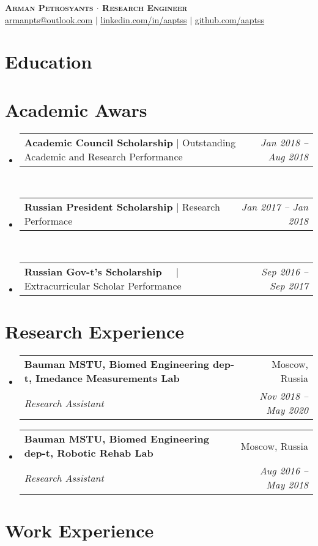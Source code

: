 \documentclass[a4paper,11pt]{article}
\makeatletter
\newcommand{\resumeSubheading}[4]{
  \vspace{-2pt}\item
    \begin{tabular*}{0.97\textwidth}[t]{l@{\extracolsep{\fill}}r}
      \textbf{#1} & #2 \\
      \textit{\small#3} & \textit{\small #4} \\
    \end{tabular*}\vspace{-7pt}
}
\newcommand{\resumeProjectHeading}[2]{
    \item
    \begin{tabular*}{0.97\textwidth}{l@{\extracolsep{\fill}}r}
      \small#1 & #2 \\
    \end{tabular*}\vspace{-7pt}
}
\newcommand{\resumeSubHeadingListStart}{\begin{itemize}[leftmargin=0.15in, label={}]}
\newcommand{\resumeSubHeadingListEnd}{\end{itemize}}
\newcommand{\DesPosition}{\(\cdot\) Research Engineer}
\makeatother
\begin{document}
\begin{center}
    \textbf{\Huge \scshape Arman Petrosyants \DesPosition } \\ \vspace{1pt}
    \href{mailto:armanpts@outlook.com}{\underline{armanpts@outlook.com}} $|$ 
    \href{https://linkedin.com/in/aaptss}{\underline{linkedin.com/in/aaptss}} $|$
    \href{https://github.com/aaptss}{\underline{github.com/aaptss}}
\end{center}

\section{Education}
  \resumeSubHeadingListStart
	
	
	
  \resumeSubHeadingListEnd

\section{Academic Awars}
    \resumeSubHeadingListStart      
      \resumeProjectHeading
          {\textbf{Academic Council Scholarship} $|$ {Outstanding Academic and Research Performance}}{\emph{Jan 2018 -- Aug 2018}}\\
      \resumeProjectHeading
          {\textbf{Russian President Scholarship} $|$ {Research Performace}}{\emph{Jan 2017 -- Jan 2018}}\\
      \resumeProjectHeading
          {\textbf{Russian Gov-t's Scholarship} $\> \> \> \> \> |$ {Extracurricular Scholar Performance}}{\emph{Sep 2016 -- Sep 2017}}
    \resumeSubHeadingListEnd

\section{Research Experience}
  \resumeSubHeadingListStart
	
    \resumeSubheading
      {Bauman MSTU, Biomed Engineering dep-t, Imedance Measurements Lab}{Moscow, Russia}
      {Research Assistant}{Nov 2018 -- May 2020}
	
	
    \resumeSubheading
      {Bauman MSTU, Biomed Engineering dep-t, Robotic Rehab Lab}{Moscow, Russia}
      {Research Assistant}{Aug 2016 -- May 2018}
	
  	
  \resumeSubHeadingListEnd

\section{Work Experience}
  \resumeSubHeadingListStart
%	
 	 
%	
 	 
  \resumeSubHeadingListEnd
\end{document}
